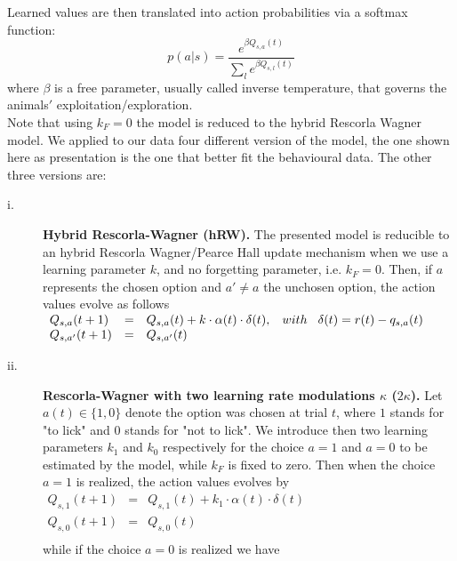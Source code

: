 Learned values are then translated into action probabilities via a softmax function:
\begin{equation}
p(a|s)=\frac{e^{\beta Q_{s,a}(t)}}{\sum_l e^{\beta Q_{s,l}(t)}}
\label{eq:ProbMod}
\end{equation}
where $\beta$ is a free parameter, usually called inverse temperature, that governs the animals$'$ exploitation/exploration.\\
Note that using $k_F = 0$ the model is reduced to the hybrid Rescorla Wagner model. We applied to our data four different version of the model, the one shown here as presentation is the one that better fit the behavioural data. The other three versions are:
\begin{description}
    \item[i.] \textbf{Hybrid Rescorla-Wagner (hRW).} The presented model is reducible to an hybrid Rescorla Wagner/Pearce Hall update mechanism when we use a learning parameter $k$, and no forgetting parameter, i.e. $k_F = 0$.
    Then, if $a$ represents the chosen option and $a'\neq a$ the unchosen option, the action values evolve as follows\\
    $\begin{array}{lcl}
    Q_{s,a}(t+1)&=& Q_{s,a}(t)+k\cdot\alpha(t)\cdot\delta(t), \hspace{0.3cm} with \hspace{0.3cm}\delta(t)=r(t)-q_{s,a}(t)\\
    Q_{s,a'}(t+1)&=&Q_{s,a'}(t)\\
    \end{array}$
    \item[ii.] \textbf{Rescorla-Wagner with two learning rate modulations $\kappa$ ($2\kappa$).} Let $a(t) \in \{1,0\}$ denote the option was chosen at trial $t$, where $1$ stands for "to lick" and $0$ stands for "not to lick". We introduce then two learning parameters $k_{1}$ and $k_{0}$ respectively for the choice $a=1$ and $a=0$ to be estimated by the model, while $k_F$ is fixed to zero.
    Then when the choice $a=1$ is realized, the action values evolves by\\
   $\begin{array}{lcl}
       Q_{s,1}(t+1)&=&Q_{s,1}(t)+k_1\cdot\alpha(t)\cdot\delta(t)\\
         Q_{s,0}(t+1)&=&Q_{s,0}(t)\\ 
    \end{array}$\\
    while if the choice $a=0$ is realized we have\\

\end{description}
